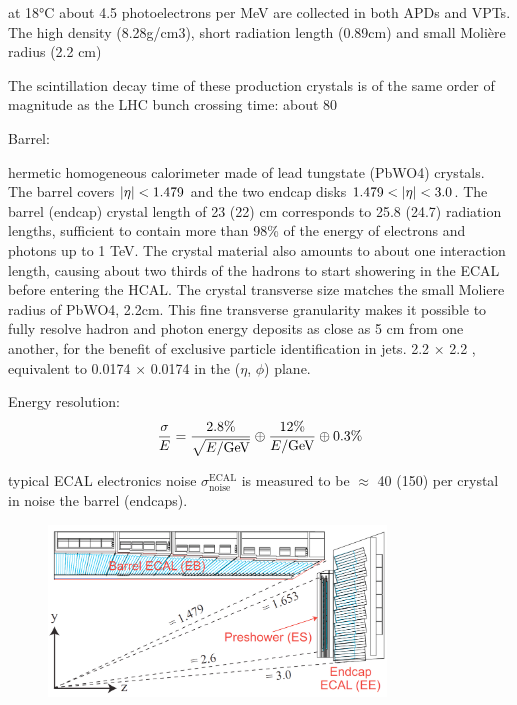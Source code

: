 at 18°C about 4.5 photoelectrons per MeV are collected in both APDs and VPTs.
The high density (8.28g/cm3), short radiation length (0.89cm) and small Molière radius (2.2 cm)

The scintillation decay time of these production crystals is of the same order of magnitude as the LHC bunch crossing time: about 80%

Barrel: 

hermetic homogeneous calorimeter made of lead tungstate (PbWO4) crystals. The barrel covers $\lvert\eta\rvert < 1.479$ and the two endcap disks $1.479 < \lvert\eta\rvert < 3.0$.
The barrel (endcap) crystal length of 23 (22) cm corresponds to 25.8 (24.7) radiation lengths, sufficient to contain more than 98\% of the energy of electrons and photons up to 1 TeV.
The crystal material also amounts to about one interaction length, causing about two thirds of the hadrons to start showering in the ECAL before entering the HCAL.
The crystal transverse size matches the small Moliere radius of PbWO4, 2.2cm. This fine transverse granularity makes it possible to fully resolve hadron and photon energy deposits as close as 5 cm from one another, for the benefit of exclusive particle identification in jets.
2.2 × 2.2 \cmsq, equivalent to 0.0174 × 0.0174 in the ($\eta$, $\phi$) plane.

Energy resolution:
\begin{equation}
\label{eqn:ecal_res}
\frac{\sigma}{E} = \frac{2.8\%}{\sqrt{E/\mathrm{GeV}}} \oplus \frac{12\%}{E/\mathrm{GeV}} \oplus 0.3\%
\end{equation}

typical ECAL electronics noise $\sigma ^{\text{ECAL}} _{\text{noise}}$ is measured to be $\approx$ 40 (150) \MeV per crystal in noise the barrel (endcaps).

\begin{figure}[htbp]
\centering
     \includegraphics[width=0.8\textwidth]{cms_and_lhc/plots/cms_ecal.png}
     \caption{
     }
     \label{fig:cms_ecal}
\end{figure}



